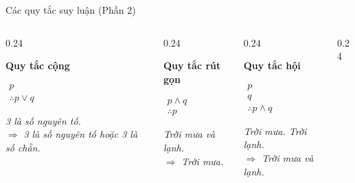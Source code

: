\documentclass[aspectratio=169, 11pt]{beamer}
\begin{document}
\begin{frame}{Các quy tắc suy luận (Phần 2)}
\begin{columns}[t, onlytextwidth]
  \begin{column}{0.24\textwidth}
    \centering
    \parbox[t][0.85cm][t]{\linewidth}{\centering\color{uitblue}\textbf{Quy tắc cộng}}\par
    \vspace{0.15cm}
    $\begin{array}{l}
      p \\
      \hline
      \therefore p \lor q
    \end{array}$\par
    \vspace{0.35cm}
    \footnotesize\textit{3 là số nguyên tố.}\\
    $\Rightarrow$ \textit{3 là số nguyên tố hoặc 3 là số chẵn.}
  \end{column}
  \begin{column}{0.24\textwidth}
    \centering
    \parbox[t][0.85cm][t]{\linewidth}{\centering\color{uitblue}\textbf{Quy tắc rút gọn}}\par
    \vspace{0.15cm}
    $\begin{array}{l}
      p \land q \\
      \hline
      \therefore p
    \end{array}$\par
    \vspace{0.35cm}
    \footnotesize\textit{Trời mưa và lạnh.}\\
    $\Rightarrow$ \textit{Trời mưa.}
  \end{column}
  \begin{column}{0.24\textwidth}
    \centering
    \parbox[t][0.85cm][t]{\linewidth}{\centering\color{uitblue}\textbf{Quy tắc hội}}\par
    \vspace{0.15cm}
    $\begin{array}{l}
      p \\
      q \\
      \hline
      \therefore p \land q
    \end{array}$\par
    \vspace{0.35cm}
    \footnotesize\textit{Trời mưa. Trời lạnh.}\\
    $\Rightarrow$ \textit{Trời mưa và lạnh.}
  \end{column}
  \begin{column}{0.24\textwidth}

\end{column}
\end{columns}
\end{frame}
\end{document}
